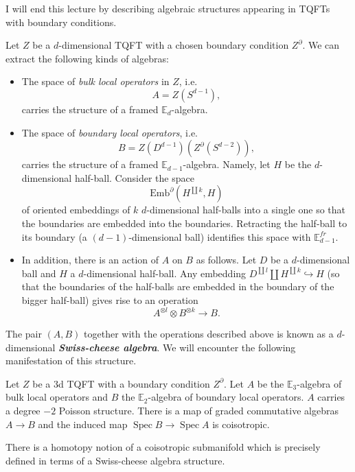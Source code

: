 \documentclass[10pt]{amsart}
\newcommand{\bE}{\mathbb{E}}
\newcommand{\Emb}{\mathrm{Emb}}
\DeclareMathOperator{\Spec}{Spec}
\newcommand{\defterm}[1]{\textbf{\emph{#1}}}
\theoremstyle{definition}
\theoremstyle{definition}
\begin{document}
I will end this lecture by describing algebraic structures appearing in TQFTs with boundary conditions.

Let $Z$ be a $d$-dimensional TQFT with a chosen boundary condition $Z^\partial$. We can extract the following kinds of algebras:
\begin{itemize}
\item The space of \emph{bulk local operators} in $Z$, i.e.
\[A = Z(S^{d-1}),\]
carries the structure of a framed $\bE_d$-algebra.

\item The space of \emph{boundary local operators}, i.e.
\[B = Z(D^{d-1})(Z^\partial(S^{d-2})),\]
carries the structure of a framed $\bE_{d-1}$-algebra. Namely, let $H$ be the $d$-dimensional half-ball. Consider the space
\[\Emb^\partial(H^{\coprod k}, H)\]
of oriented embeddings of $k$ $d$-dimensional half-balls into a single one so that the boundaries are embedded into the boundaries. Retracting the half-ball to its boundary (a $(d-1)$-dimensional ball) identifies this space with $\bE^{fr}_{d-1}$.

\item In addition, there is an action of $A$ on $B$ as follows. Let $D$ be a $d$-dimensional ball and $H$ a $d$-dimensional half-ball. Any embedding $D^{\coprod l}\coprod H^{\coprod k}\hookrightarrow H$ (so that the boundaries of the half-balls are embedded in the boundary of the bigger half-ball) gives rise to an operation
\[A^{\otimes l}\otimes B^{\otimes k}\longrightarrow B.\]
\end{itemize}

The pair $(A, B)$ together with the operations described above is known as a $d$-dimensional \defterm{Swiss-cheese algebra}. We will encounter the following manifestation of this structure.

\begin{example}
Let $Z$ be a 3d TQFT with a boundary condition $Z^\partial$. Let $A$ be the $\bE_3$-algebra of bulk local operators and $B$ the $\bE_2$-algebra of boundary local operators. $A$ carries a degree $-2$ Poisson structure. There is a map of graded commutative algebras $A\rightarrow B$ and the induced map $\Spec B\rightarrow \Spec A$ is coisotropic.
\end{example}

\begin{remark}
There is a homotopy notion of a coisotropic submanifold which is precisely defined in terms of a Swiss-cheese algebra structure.
\end{remark}
\end{document}
